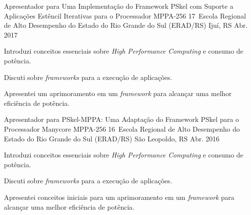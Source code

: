 \begin{cventries}
  \cventry
    {Apresentador para Uma Implementação do Framework PSkel com Suporte a
    Aplicações Estêncil Iterativas para o Processador MPPA-256}
    {17\textordmasculine~Escola Regional de Alto Desempenho do Estado do Rio Grande do Sul (ERAD/RS)} %
    {Ijuí, RS} %
    {Abr. 2017} %
    {
      \begin{cvitems} %
      \item {Introduzi conceitos essenciais sobre \textit{High Performance
        Computing} e consumo de potência.}
      \item {Discuti sobre \textit{frameworks} para a execução de aplicações.}
      \item {Apresentei um aprimoramento em um \textit{framework} para alcançar
        uma melhor eficiência de potência.}
      \end{cvitems}
    }


  \cventry
    {Apresentador para PSkel-MPPA: Uma Adaptação do Framework PSkel para o
    Processador Manycore MPPA-256}
    {16\textordmasculine~Escola Regional de Alto Desempenho do Estado do Rio Grande do Sul (ERAD/RS)} %
    {São Leopoldo, RS} %
    {Abr. 2016} %
    {
      \begin{cvitems} %
      \item {Introduzi conceitos essenciais sobre \textit{High Performance
        Computing} e consumo de potência.}
      \item {Discuti sobre \textit{frameworks} para a execução de aplicações.}
      \item {Apresentei conceitos iniciais para um aprimoramento em um
              \textit{framework} para alcançar uma melhor eficiência de
          potência.}
      \end{cvitems}
    }

\end{cventries}
